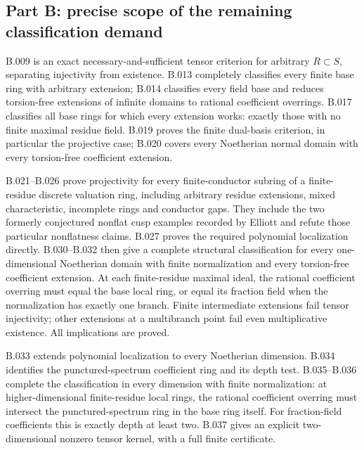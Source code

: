 \subsection*{Part B: precise scope of the remaining classification demand}
B.009 is an exact necessary-and-sufficient tensor criterion for arbitrary
$R\subset S$, separating injectivity from existence. B.013 completely
classifies every finite base ring with arbitrary extension; B.014
classifies every field base and reduces torsion-free extensions of
infinite domains to rational coefficient overrings. B.017 classifies
all base rings for which every extension works: exactly those with no
finite maximal residue field. B.019 proves the finite dual-basis
criterion, in particular the projective case; B.020 covers every
Noetherian normal domain with every torsion-free coefficient extension.

B.021--B.026 prove projectivity for every finite-conductor subring of
a finite-residue discrete valuation ring, including arbitrary residue
extensions, mixed characteristic, incomplete rings and conductor gaps.
They include the two formerly conjectured nonflat cusp examples
recorded by Elliott and refute those particular nonflatness claims.
B.027 proves the required polynomial localization directly. B.030--B.032
then give a complete structural classification for every one-dimensional
Noetherian domain with finite normalization and every torsion-free
coefficient extension. At each finite-residue maximal ideal, the rational
coefficient overring must equal the base local ring, or equal its fraction
field when the normalization has exactly one branch. Finite intermediate
extensions fail tensor injectivity; other extensions at a multibranch
point fail even multiplicative existence. All implications are proved.

B.033 extends polynomial localization to every Noetherian dimension.
B.034 identifies the punctured-spectrum coefficient ring and its depth
test. B.035--B.036 complete the classification in every dimension with
finite normalization: at higher-dimensional finite-residue local rings,
the rational coefficient overring must intersect the punctured-spectrum
ring in the base ring itself. For fraction-field coefficients this is
exactly depth at least two. B.037 gives an explicit two-dimensional
nonzero tensor kernel, with a full finite certificate.

